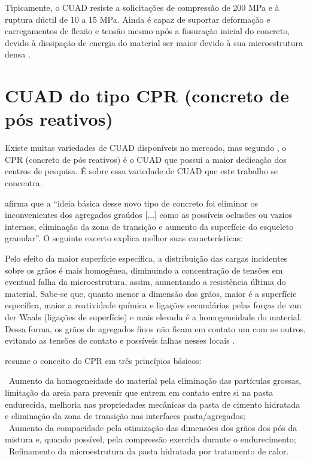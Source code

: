 Tipicamente, o CUAD resiste a solicitações de compressão de 200 MPa e à ruptura dúctil de 10 a 15 MPa. Ainda é capaz de suportar deformação e carregamentos de flexão e tensão mesmo após a fissuração inicial do concreto, devido à dissipação de energia do material ser maior devido à sua microestrutura densa \cite[p.~1]{Gunes}.

\section{CUAD do tipo CPR (concreto de pós reativos)}

Existe muitas variedades de CUAD disponíveis no mercado, mas segundo , o CPR (concreto de pós reativos) é o CUAD que possui a maior dedicação dos centros de pesquisa. É sobre essa variedade de CUAD que este trabalho se concentra.

 afirma que a “ideia básica desse novo tipo de concreto foi eliminar os inconvenientes dos agregados graúdos [...] como as possíveis oclusões ou vazios internos, eliminação da zona de transição e aumento da superfície do esqueleto granular”. O seguinte excerto explica melhor suas características:

\begin{citacao}
Pelo efeito da maior superfície específica, a distribuição das cargas incidentes sobre os grãos é mais homogênea, diminuindo a concentração de tensões em eventual falha da microestrutura, assim, aumentando a resistência última do material. Sabe-se que, quanto menor a dimensão dos grãos, maior é a superfície específica, maior a reatividade química e ligações secundárias pelas forças de van der Waals (ligações de superfície) e mais elevada é a homogeneidade do material. Dessa forma, os grãos de agregados finos não ficam em contato um com os outros, evitando as tensões de contato e possíveis falhas nesses locais \cite[p.~1312]{Tutikian}.
\end{citacao}

 resume o conceito do CPR em três princípios básicos:

\begin{citacao}
\textbullet~Aumento da homogeneidade do material pela eliminação das partículas grossas, limitação da areia para prevenir que entrem em contato entre si na pasta endurecida, melhoria nas propriedades mecânicas da pasta de cimento hidratada e eliminação da zona de transição nas interfaces pasta/agregados;\\
\textbullet~Aumento da compacidade pela otimização das dimensões dos grãos dos pós da mistura e, quando possível, pela compressão exercida durante o endurecimento;\\
\textbullet~Refinamento da microestrutura da pasta hidratada por tratamento de calor.
\end{citacao}

